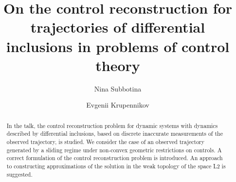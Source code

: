 \begin{englishtitle} %
\title{On the control reconstruction for trajectories of differential inclusions in problems of control theory}
\author{Nina Subbotina \and  Evgenii Krupennikov 
}

\maketitle

\begin{abstract}
In the talk, the control reconstruction problem for
dynamic systems with dynamics described by differential inclusions, based on discrete inaccurate measurements of the observed trajectory, is studied.
We consider the case of an observed trajectory generated by a sliding
regime under non-convex geometric restrictions on controls. A correct formulation of the control reconstruction problem is introduced. An approach to constructing
approximations of the solution in the weak topology of the space L2 is suggested.

\end{abstract}
\end{englishtitle}

\iffalse
%
%


\documentclass[12pt]{llncs}


\usepackage{iftex}

\ifPDFTeX
\usepackage[T2A]{fontenc}
\usepackage[utf8]{inputenc} %
\usepackage[english,russian]{babel}
\fi

\usepackage{todonotes}

\usepackage[russian]{nla}


